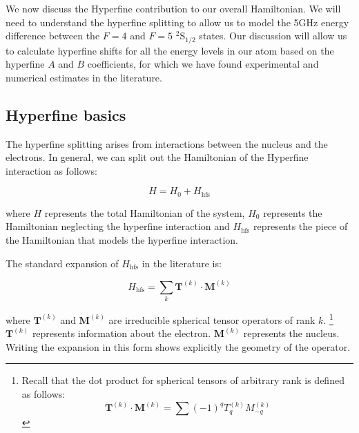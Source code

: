 We now discuss the Hyperfine contribution to our overall Hamiltonian. We will need to understand the hyperfine splitting to allow us to model the 5GHz energy difference between the $F=4$ and $F=5$ $^2$S$_{1/2}$ states. Our discussion will allow us to calculate hyperfine shifts for all the energy levels in our atom based on the hyperfine $A$ and $B$ coefficients, for which we have found experimental and numerical estimates in the literature.

\subsection{Hyperfine basics}

The hyperfine splitting arises from interactions between the nucleus and the electrons. In general, we can split out the Hamiltonian of the Hyperfine interaction as follows: 

\begin{equation}
H=H_0+H_{\mathrm{hfs}}
\end{equation}

where $H$ represents the total Hamiltonian of the system, $H_0$ represents the Hamiltonian neglecting the hyperfine interaction and $H_{\mathrm{hfs}}$ represents the piece of the Hamiltonian that models the hyperfine interaction. 

The standard expansion of $H_{\mathrm{hfs}}$ in the literature is:  

\begin{equation}
H_{\mathrm{hfs}}=\sum_k \mathbf{T}^{(k)} \cdot \mathbf{M}^{(k)} \label{hfs_hamiltonian_eqn}
\end{equation}
\cite{schwartz_hyperfine_expansion}
\cite{experimental_hyperfine_alkali_arimondo}
\cite{chinesePhysics}

where $\mathbf{T}^{(k)}$ and $\mathbf{M}^{(k)}$ are irreducible spherical tensor operators of rank $k$.
\footnote{Recall that the dot product for spherical tensors of arbitrary rank is defined as follows:
\begin{equation}\label{TkMk_hyperfine}
\mathbf{T}^{(k)}\cdot\mathbf{M}^{(k)}=\sum (-1)^qT_q^{(k)}M_{-q}^{(k)}
\end{equation}
}
 $\mathbf{T}^{(k)}$ represents information about the electron.
$\mathbf{M}^{(k)}$ represents the nucleus.\cite{experimental_hyperfine_alkali_arimondo}\cite{schwartz_hyperfine_expansion}
\cite{sobelman_spectra}
Writing the expansion in this form shows explicitly the geometry of the operator. 

